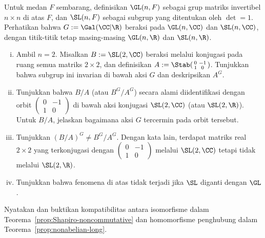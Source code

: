 \begin{Exercises}
	\item Untuk medan $F$ sembarang, definisikan $\GL(n,F)$ sebagai grup
	matriks invertibel $n\times n$ di atas $F$, dan $\SL(n,F)$ sebagai subgrup
	yang ditentukan oleh $\det=1$. Perhatikan bahwa
	$G:=\Gal(\CC|\R)$ beraksi pada $\GL(n,\CC)$ dan $\SL(n,\CC)$, dengan
	titik-titik tetap masing-masing $\GL(n,\R)$ dan $\SL(n,\R)$.
	\begin{enumerate}[(i)]
		\item Ambil $n=2$. Misalkan $B:=\SL(2,\CC)$ beraksi melalui konjugasi
		pada ruang semua matriks $2\times2$, dan definisikan
		$A:=\Stab(\begin{smallmatrix}0&-1\\1&0\end{smallmatrix})$. Tunjukkan
		bahwa subgrup ini invarian di bawah aksi $G$ dan deskripsikan $A^G$.
		\item Tunjukkan bahwa $B/A$ (atau $B^G/A^G$) secara alami diidentifikasi
		dengan orbit $\left(\begin{smallmatrix}0&-1\\1&0\end{smallmatrix}\right)$
		di bawah aksi konjugasi $\SL(2,\CC)$ (atau $\SL(2,\R)$). Untuk $B/A$,
		jelaskan bagaimana aksi $G$ tercermin pada orbit tersebut.
		\item Tunjukkan $(B/A)^G\neq B^G/A^G$. Dengan kata lain, terdapat
		matriks real $2\times2$ yang terkonjugasi dengan
		$\left(\begin{smallmatrix}0&-1\\1&0\end{smallmatrix}\right)$ melalui
		$\SL(2,\CC)$ tetapi tidak melalui $\SL(2,\R)$.
		\item Tunjukkan bahwa fenomena di atas tidak terjadi jika $\SL$ diganti
		dengan $\GL$.
	\end{enumerate}

	\item Nyatakan dan buktikan kompatibilitas antara isomorfisme dalam
	Teorema~\ref{prop:Shapiro-noncommutative} dan homomorfisme penghubung dalam
	Teorema~\ref{prop:nonabelian-long}.


\end{Exercises}
